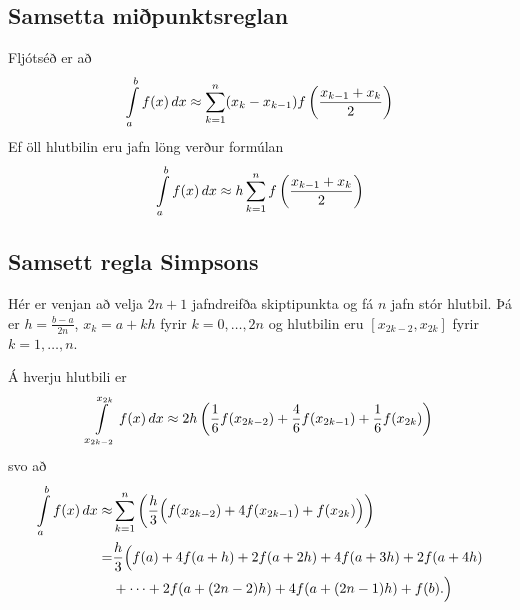\documentclass[letterpaper,10pt,icelandic]{sphinxmanual}
\begin{document}

\subsection{Samsetta miðpunktsreglan}
\label{kafli05:index-7}\label{kafli05:samsetta-mipunktsreglan}
Fljótséð er að
\begin{gather}
\begin{split}\int\limits_a^b f(x) \, dx
  \approx
  \sum\limits_{k=1}^n (x_k-x_{k-1})f
  \left(
    \frac{x_{k-1}+x_k}{2}
  \right)\end{split}\notag
\end{gather}
Ef öll hlutbilin eru jafn löng verður formúlan
\begin{gather}
\begin{split}\int\limits_a^b f(x) \, dx
  \approx
  h \sum\limits_{k=1}^n f \left(\frac{x_{k-1}+x_k}{2}\right)\end{split}\notag
\end{gather}

\subsection{Samsett regla Simpsons}
\label{kafli05:samsett-regla-simpsons}\label{kafli05:index-8}
Hér er venjan að velja \(2n+1\) jafndreifða skiptipunkta og fá
\(n\) jafn stór hlutbil. Þá er \(h = \frac{b-a}{2n}\),
\(x_k = a + kh\) fyrir \(k =
0,\ldots,2n\) og hlutbilin eru \([x_{2k-2},x_{2k}]\) fyrir
\(k = 1,
\ldots, n\).

Á hverju hlutbili er
\begin{gather}
\begin{split}\int\limits_{x_{2k-2}}^{x_{2k}} f(x) \, dx
  \approx
  2h \left(
    \frac{1}{6} f(x_{2k-2}) + \frac{4}{6} f(x_{2k-1})
    + \frac{1}{6} f(x_{2k})
  \right)\end{split}\notag
\end{gather}
svo að
\begin{gather}
\begin{split}\begin{aligned}
  \int\limits_a^b f(x) \, dx
  \approx &
  \sum\limits_{k=1}^n
  \bigg(
    \frac{h}{3}
    \Big(
      f(x_{2k-2}) + 4f(x_{2k-1}) + f(x_{2k})
    \Big)
  \bigg) \\
  = &
  \frac{h}{3}
  \Big(
    f(a) + 4f(a+h) + 2f(a+2h)+ 4f(a+3h) + 2f(a+4h) \\
    &+ \cdots + 2f(a+(2n-2)h) + 4f(a+(2n-1)h) + f(b).
  \Big)\end{aligned}\end{split}\notag
\end{gather}
\end{document}
